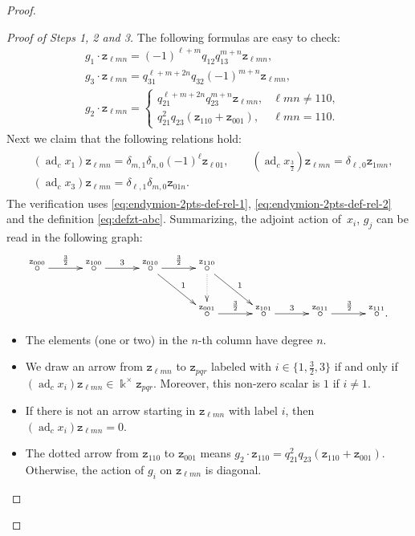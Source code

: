 \documentclass[10pt,a4paper]{amsart}
\numberwithin{equation}{section}
\newcommand{\adc}{\operatorname{ad}_c}
\newcommand{\zt}{\mathtt{z}}
\newcommand{\tresdos}{\frac{3}{2}}
\begin{document}
\begin{proof}
\begin{proof}[Proof of Steps 1, 2 and 3]
The following formulas are easy to check:
\begin{align*}
&g_1 \cdot \zt_{\ell mn} = (-1)^{\ell +m}q_{12}q_{13}^{m+n}\zt_{\ell mn},
\\ &g_3 \cdot \zt_{\ell mn} = q_{31}^{\ell +m+2n}q_{32}(-1)^{m+n}\zt_{\ell mn},
\\
&g_2 \cdot \zt_{\ell mn} = \begin{cases}
q_{21}^{\ell+m+2n}q_{23}^{m+n}\zt_{\ell mn}, & \ell mn\ne 110,
\\
q_{21}^2q_{23}(\zt_{110}+\zt_{001}), & \ell mn=110.
\end{cases}
\end{align*}
Next we claim that the following relations hold:
\begin{align}\label{eq:endymion-2pts-adc-on-z}
\begin{aligned}
&(\adc x_1)\zt_{\ell mn} = \delta_{m,1}\delta_{n,0}(-1)^{\ell }\zt_{\ell 01}, \qquad
(\adc x_{\tresdos})\zt_{\ell mn} = \delta_{\ell ,0}\zt_{1mn},
\\
&(\adc x_3)\zt_{\ell mn} = \delta_{\ell ,1}\delta_{m,0}\zt_{01n}.
\end{aligned}
\end{align}
The verification uses \eqref{eq:endymion-2pts-def-rel-1}, \eqref{eq:endymion-2pts-def-rel-2} and the definition \eqref{eq:defzt-abc}.
Summarizing, the adjoint action of~$x_i$, $g_j$ can be read in the following graph:
$$
\xymatrix@C=30pt{\overset{\zt_{000}}{\circ} \ar@{->}[r]^{\tresdos} &
\overset{\zt_{100}}{\circ} \ar@{->}[r]^{3} &
\overset{\zt_{010}}{\circ} \ar@{->}[r]^{\tresdos} \ar@{->}[rd]^{1} &
\overset{\zt_{110}}{\circ} \ar@{->}[rd]^{1} \ar@{.>}[d] &
& &
\\
& & &
\overset{\zt_{001}}{\circ} \ar@{->}[r]^{\tresdos} &
\overset{\zt_{101}}{\circ} \ar@{->}[r]^{3} &
\overset{\zt_{011}}{\circ} \ar@{->}[r]^{\tresdos} &
\overset{\zt_{111}}{\circ}. }
$$
\begin{itemize}[leftmargin=*]
\item The elements (one or two) in the $n$-th column have degree $n$.
\item We draw an arrow from $\zt_{\ell mn}$ to $\zt_{pqr}$ labeled with $i\in\big\{1,\tresdos,3\big\}$ if and only if
$(\adc x_i)\zt_{\ell mn}\in\Bbbk^{\times} \zt_{pqr}$. Moreover, this non-zero scalar is $1$ if $i\ne 1$.
\item If there is not an arrow starting in $\zt_{\ell mn}$ with label $i$, then $(\adc x_i)\zt_{\ell mn}=0$.
\item The dotted arrow from $\zt_{110}$ to $\zt_{001}$ means $g_2 \cdot \zt_{110}= q_{21}^2q_{23}(\zt_{110}+\zt_{001})$. Otherwise, the action of $g_i$ on $\zt_{\ell mn}$ is diagonal.
\end{itemize}


\end{proof}
\end{proof}
\end{document}
